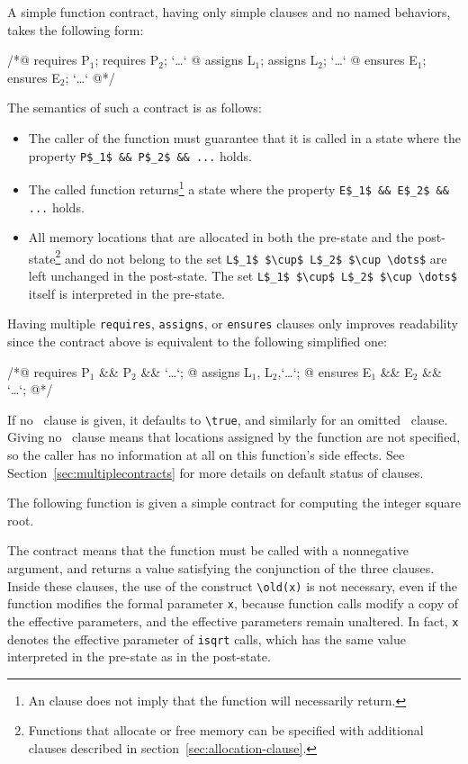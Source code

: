 A simple function contract, having only simple clauses and no named behaviors, takes the following
form:
\begin{listing}{1}
/*@ requires P$_1$; requires P$_2$; `\dots`
  @ assigns L$_1$;  assigns L$_2$;  `\dots`
  @ ensures E$_1$;  ensures E$_2$;  `\dots`
  @*/
\end{listing}
The semantics of such a contract is as follows:
\begin{itemize}
\item The caller of the function must guarantee that it is called in a
  state where the property \lstinline|P$_1$ && P$_2$ && ...| holds.
\item The called function returns\footnote{An \ensures{} clause does not
  imply that the function will necessarily return.} a state where the property
  \lstinline|E$_1$ && E$_2$ && ...| holds.
\item All memory locations that are allocated in both the pre-state and 
  the post-state\footnote{Functions that allocate or free memory can be 
    specified with additional clauses described in
    section~\ref{sec:allocation-clause}.} 
  and do not belong to the
  set \lstinline|L$_1$ $\cup$ L$_2$ $\cup \dots$| are left unchanged in the
  post-state. The set \lstinline|L$_1$ $\cup$ L$_2$ $\cup \dots$| 
  itself is interpreted in the pre-state.
\end{itemize}

Having multiple \lstinline|requires|, \lstinline|assigns|, or 
\lstinline|ensures| clauses only improves 
readability since the contract above is equivalent to the following
simplified one:
\begin{listing}{1}
/*@ requires P$_1$ && P$_2$ && `\dots`;
  @ assigns L$_1$, L$_2$,`\dots`;
  @ ensures E$_1$ && E$_2$ && `\dots`;
  @*/
\end{listing}
If no \requires\ clause is given, it defaults to
\lstinline!\true!, and similarly for an omitted \ensures\ clause.
Giving no \assigns\ clause
means that locations assigned by the function are not specified, so
the caller has no information at all on this function's side
effects. See Section~\ref{sec:multiplecontracts} for more details on
default status of clauses.

\begin{example}
  The following function is given a simple contract for computing
  the integer square root.

%
  The contract means that the function must be called with a
  nonnegative argument, and returns a value satisfying
  the conjunction of the three \ensures{} clauses.
  Inside these \ensures{} clauses, the use of the construct \lstinline|\old(x)|
  is not necessary, even if the function modifies the formal
  parameter
  \lstinline|x|, because function calls modify a copy of the effective parameters,
  and the effective parameters remain unaltered.  In fact, \lstinline|x| denotes
  the effective parameter of \lstinline|isqrt| calls, which has the same value
  interpreted in the pre-state as in the post-state.

\end{example}

